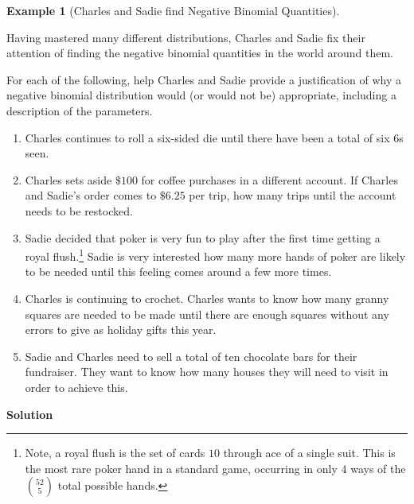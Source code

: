 \documentclass[
  letterpaper,
  DIV=11,
  numbers=noendperiod]{scrreprt}
\providecommand{\tightlist}{%
  \setlength{\itemsep}{0pt}\setlength{\parskip}{0pt}}\usepackage{longtable,booktabs,array}
\theoremstyle{definition}
\theoremstyle{definition}
\newtheorem{example}{Example}[chapter]
\theoremstyle{definition}
\theoremstyle{remark}
\begin{document}
\begin{example}[Charles and Sadie find Negative Binomial
Quantities]\protect\hypertarget{exm-negative-binomial-list}{}\label{exm-negative-binomial-list}

Having mastered many different distributions, Charles and Sadie fix
their attention of finding the negative binomial quantities in the world
around them.

For each of the following, help Charles and Sadie provide a
justification of why a negative binomial distribution would (or would
not be) appropriate, including a description of the parameters.

\begin{enumerate}
\def\labelenumi{\alph{enumi}.}
\tightlist
\item
  Charles continues to roll a six-sided die until there have been a
  total of six \(6\)s seen.
\item
  Charles sets aside \(\$100\) for coffee purchases in a different
  account. If Charles and Sadie's order comes to \(\$6.25\) per trip,
  how many trips until the account needs to be restocked.
\item
  Sadie decided that poker is very fun to play after the first time
  getting a royal flush.\footnote{Note, a royal flush is the set of
    cards \(10\) through ace of a single suit. This is the most rare
    poker hand in a standard game, occurring in only \(4\) ways of the
    \(\binom{52}{5}\) total possible hands.} Sadie is very interested
  how many more hands of poker are likely to be needed until this
  feeling comes around a few more times.
\item
  Charles is continuing to crochet. Charles wants to know how many
  granny squares are needed to be made until there are enough squares
  without any errors to give as holiday gifts this year.
\item
  Sadie and Charles need to sell a total of ten chocolate bars for their
  fundraiser. They want to know how many houses they will need to visit
  in order to achieve this.
\end{enumerate}

\begin{tcolorbox}[enhanced jigsaw, colback=white, colframe=quarto-callout-color-frame, arc=.35mm, leftrule=.75mm, rightrule=.15mm, opacityback=0, breakable, bottomrule=.15mm, left=2mm, toprule=.15mm]

\vspace{-3mm}\textbf{Solution}\vspace{3mm}


\end{tcolorbox}
\end{example}
\end{document}
